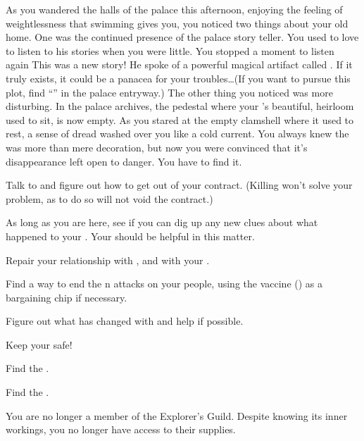 \documentclass[char]{NeptuneBall}
\begin{document}
As you wandered the halls of the palace this afternoon, enjoying the feeling of weightlessness that swimming gives you, you noticed two things about your old home. One was the continued presence of the palace story teller. You used to love to listen to his stories when you were little. You stopped a moment to listen again This was a new story! He spoke of a powerful magical artifact called \iWishingStone{\MYname}. If it truly exists, it could be a panacea for your troubles\ldots (If you want to pursue this plot, find ``\sOldMan{}'' in the palace entryway.) The other thing you noticed was more disturbing. In the palace archives, the pedestal where your \cAthena{\parent}'s beautiful, heirloom \iMusicBox{} used to sit, is now empty. As you stared at the empty clamshell where it used to rest, a sense of dread washed over you like a cold current. You always knew the \iMusicBox{} was more than mere decoration, but now you were convinced that it's disappearance left \pAtlantis{} open to danger. You have to find it.


\begin{itemz}[Goals]
  \item Talk to \cWitch{} and figure out how to get out of your contract. (Killing \cWitch{} won't solve your problem, as to do so will not void the contract.)
  \item As long as you are here, see if you can dig up any new clues about what happened to your \cAthena{\parent}. Your \cPrincess{\sibling} should be helpful in this matter.
  \item Repair your relationship with \cKing{\King} \cKing{}, and with your \cPrincess{\sibling} \cPrincess{}.
	\item Find a way to end the \pPacifica{}n attacks on your people, using the vaccine (\iVaccine{}) as a bargaining chip if necessary.
  \item Figure out what has changed with \cPriest{} and help \cPriest{\them} if possible.
  \item Keep your \cWillow{\offspring} safe!
  \item Find the \iWishingStone{}.
  \item Find the \iMusicBox{}.
\end{itemz}

\begin{itemz}[Notes]
  \item You are no longer a member of the Explorer's Guild. Despite knowing its inner workings, you no longer have access to their supplies.
\end{itemz}
\end{document}
